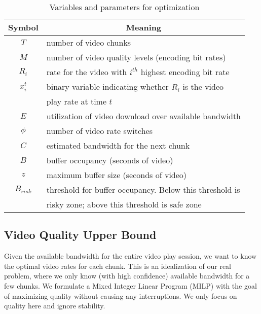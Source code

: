 \begin{table} [bt]
\small
\begin{tabular} {|c |l |}
\hline
\textbf{Symbol}&\multicolumn{1}{c|}{\textbf{Meaning} }\\ \hline
$T$ &number of video chunks  \\ \hline
$M$ &number of video quality levels (encoding bit rates)\\ \hline
$R_i$& rate for the video with $i^{th}$ highest encoding bit rate \\ \hline
$x_i^t$& binary variable indicating whether $R_i$ is the video \\
& play rate at time $t$ \\ \hline
$E$& utilization of video download over available bandwidth \\ \hline
$\phi$ &number of video rate switches \\ \hline
$C $ & estimated bandwidth for the next chunk\\ \hline
$B $ & buffer occupancy (seconds of video) \\ \hline
$z $ &maximum buffer size (seconds of video) \\ \hline
$B_{risk} $ & threshold for buffer occupancy. Below this threshold is\\
& risky zone; above this threshold is safe zone \\ \hline
\end{tabular}
\centering
\caption{Variables and parameters for optimization}
\label{tab:notation}
\end{table}
\subsection{Video Quality Upper Bound}\label{subsec:offline}


Given the available bandwidth for the entire video play
session, we want to know the optimal video rates for each chunk. This
is an idealization of our real problem, where we only know (with high
confidence) available bandwidth for a few chunks.
We formulate a Mixed Integer Linear Program (MILP) with the goal of
maximizing quality without causing any interruptions. We only focus on quality here and ignore stability. 


